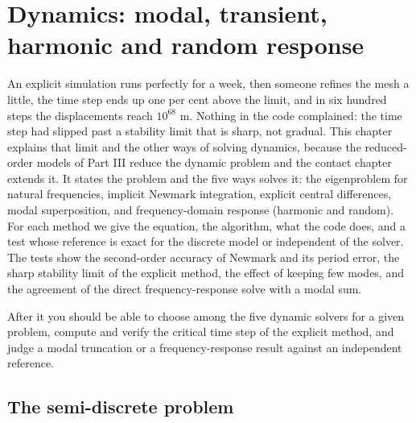 \chapter{Dynamics: modal, transient, harmonic and random response}\label{ch:dyn}

\begin{tcolorbox}[colback=hpale,colframe=hnavy!60,coltitle=white,colbacktitle=hnavy!85,title={In this chapter}]
An explicit simulation runs perfectly for a week, then someone refines the mesh a little, the time step ends up one per cent above the limit, and in six hundred steps the displacements reach $10^{68}$ m. Nothing in the code complained: the time step had slipped past a stability limit that is sharp, not gradual. This chapter explains that limit and the other ways of solving dynamics, because the reduced-order models of Part III reduce the dynamic problem and the contact chapter extends it. It states the problem and the five ways \fea{} solves it: the eigenproblem for natural frequencies, implicit Newmark integration, explicit central differences, modal superposition, and frequency-domain response (harmonic and random). For each method we give the equation, the algorithm, what the code does, and a test whose reference is exact for the discrete model or independent of the solver. The tests show the second-order accuracy of Newmark and its period error, the sharp stability limit of the explicit method, the effect of keeping few modes, and the agreement of the direct frequency-response solve with a modal sum.\par\smallskip
After it you should be able to choose among the five dynamic solvers for a given problem, compute and verify the critical time step of the explicit method, and judge a modal truncation or a frequency-response result against an independent reference.
\end{tcolorbox}

\section{The semi-discrete problem}\label{sec:dy-problem}


